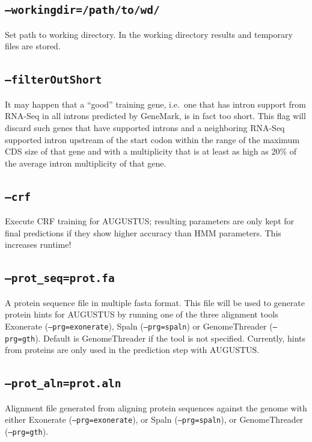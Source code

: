 \documentclass[a4paper,10pt]{report}
\begin{document}
    \subsection{\texttt{--workingdir=/path/to/wd/}}            Set path to working directory. In the working directory results
                                         and temporary files are stored.
    \subsection{\texttt{--filterOutShort}}                     It may happen that a ``good'' training gene, i.e.~one that has intron
                                         support from RNA-Seq in all introns predicted by GeneMark, is in fact
                                         too short. This flag will discard such genes that have supported introns
                                         and a neighboring RNA-Seq supported intron upstream of the start codon 
                                         within the range of the maximum CDS size of that gene and with a 
                                         multiplicity that is at least as high as 20\% of the average intron 
                                         multiplicity of that gene.
    \subsection{\texttt{--crf}}                                Execute CRF training for AUGUSTUS; resulting parameters are only kept for
                                         final predictions if they show higher accuracy than HMM parameters. This increases runtime!
    \subsection{\texttt{--prot\_seq=prot.fa}}                   A protein sequence file in multiple fasta format. This file will be used
                                         to generate protein hints for AUGUSTUS by running one of the three
                                         alignment tools Exonerate (\texttt{--prg=exonerate}), Spaln (\texttt{--prg=spaln}) or 
                                         GenomeThreader (\texttt{--prg=gth}). Default is GenomeThreader if the tool is not 
                                         specified.
                                         Currently, hints from proteins are only used in the prediction step with
                                         AUGUSTUS. 
    \subsection{\texttt{--prot\_aln=prot.aln}}                  Alignment file generated from aligning protein sequences against the 
                                         genome with either Exonerate (\texttt{--prg=exonerate}), or Spaln (\texttt{--prg=spaln}), or
                                         GenomeThreader (\texttt{--prg=gth}).
                                         
\end{document}

